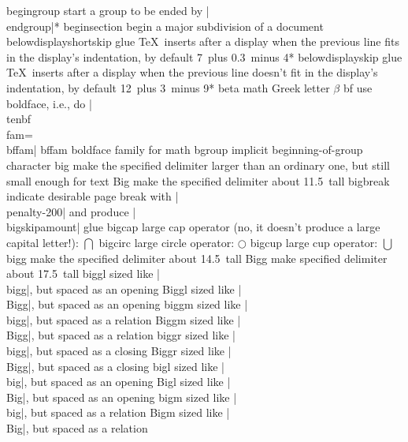 \capcs begingroup {start a group to be ended by |\\endgroup|}*{}
\capcs beginsection {begin a major subdivision of a document}{}%
   {\@beginsection}
\capcs belowdisplayshortskip {glue \TeX\ inserts after a display when the
   previous line fits in the display's indentation, 
      by default 7\pt\ plus 0.3\pt\ minus 4\pt}*{}
\capcs belowdisplayskip {glue \TeX\ inserts after a display when the previous
   line doesn't fit in the display's indentation,
   by default 12\pt\ plus 3\pt\ minus 9\pt}*{}
\capcs beta {math Greek letter $\beta$}{}{}
\capcs bf {use boldface, i.e., do |\\tenbf\\fam=\\bffam|}{}{}
\capcs bffam {boldface family for math}{}{}
\capcs bgroup {implicit beginning-of-group character}{}{}
\capcs big {make the specified delimiter larger than an ordinary one, but
   still small enough for text}{}{}
\capcs Big {make the specified delimiter about 11.5\pt\ tall}{}{}
\capcs bigbreak {indicate desirable page break with |\\penalty-200|
   and produce |\\bigskipamount| glue}{}{}
\capcs bigcap {large cap operator (no, it doesn't produce a large
   capital letter!): $\bigcap$}{}{}
\capcs bigcirc {large circle operator: $\bigcirc$}{}{}
\capcs bigcup {large cup operator: $\bigcup$}{}{}
\capcs bigg {make the specified delimiter about 14.5\pt\ tall}{}{}
\capcs Bigg {make specified delimiter about 17.5\pt\ tall}{}{}
\capcs biggl {sized like |\\bigg|, but spaced as an opening}{}{}
\capcs Biggl {sized like |\\Bigg|, but spaced as an opening}{}{}
\capcs biggm {sized like |\\bigg|, but spaced as a relation}{}{}
\capcs Biggm {sized like |\\Bigg|, but spaced as a relation}{}{}
\capcs biggr {sized like |\\bigg|, but spaced as a closing}{}{}
\capcs Biggr {sized like |\\Bigg|, but spaced as a closing}{}{}
\capcs bigl {sized like |\\big|, but spaced as an opening}{}{}
\capcs Bigl {sized like |\\Big|, but spaced as an opening}{}{}
\capcs bigm {sized like |\\big|, but spaced as a relation}{}{}
\capcs Bigm {sized like |\\Big|, but spaced as a relation}{}{}
